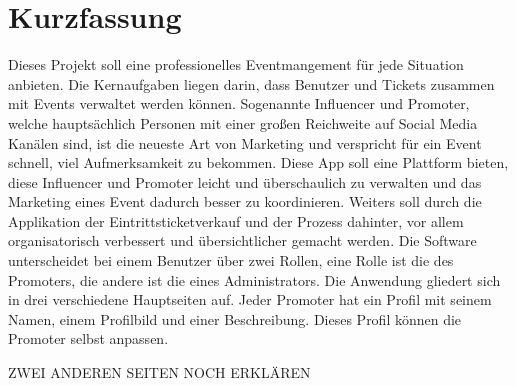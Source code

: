 \chapter{Kurzfassung}
Dieses Projekt soll eine professionelles Eventmangement für jede Situation anbieten. Die Kernaufgaben liegen darin, dass Benutzer und Tickets zusammen mit Events verwaltet werden können. Sogenannte Influencer und Promoter, welche hauptsächlich Personen mit einer großen Reichweite auf Social Media Kanälen sind, ist die neueste Art von Marketing und verspricht für ein Event schnell, viel Aufmerksamkeit zu bekommen. Diese App soll eine Plattform bieten, diese Influencer und Promoter leicht und überschaulich zu verwalten und das Marketing eines Event dadurch besser zu koordinieren. Weiters soll durch die Applikation der Eintrittsticketverkauf und der Prozess dahinter, vor allem organisatorisch verbessert und übersichtlicher gemacht werden. 
Die Software unterscheidet bei einem Benutzer über zwei Rollen, eine Rolle ist die des Promoters, die andere ist die eines Administrators. Die Anwendung gliedert sich in drei verschiedene Hauptseiten auf. Jeder Promoter hat ein Profil mit seinem Namen, einem Profilbild und einer Beschreibung. Dieses Profil können die Promoter selbst anpassen. 

ZWEI ANDEREN SEITEN NOCH ERKLÄREN